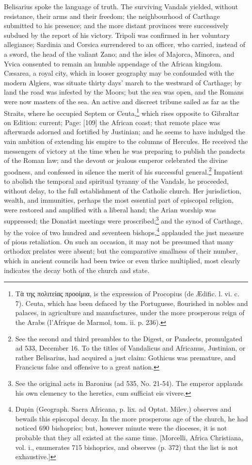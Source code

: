 Belisarius spoke the language of truth. The surviving Vandals yielded, without resistance, their arms and their freedom; the neighbourhood of Carthage submitted to his presence; and the more distant provinces were successively subdued by the report of his victory. Tripoli was confirmed in her voluntary allegiance; Sardinia and Corsica surrendered to an officer, who carried, instead of a sword, the head of the valiant Zano; and the isles of Majorca, Minorca, and Yvica consented to remain an humble appendage of the African kingdom. Cæsarea, a royal city, which in looser geography may be confounded with the modern Algiers, was situate thirty days\texthebrew{}’ march to the westward of Carthage; by land the road was infested by the Moors; but the sea was open, and the Romans were now masters of the sea. An active and discreet tribune sailed as far as the Straits, where he occupied Septem or Ceuta,\footnote{\textgreek{Τ\texthebrew{ὰ} της πολιτείας προοίμια}, is the expression of Procopius (de Ædific. l. vi. c. 7). Ceuta, which has been defaced by the Portuguese, flourished in nobles and palaces, in agriculture and manufactures, under the more prosperous reign of the Arabs (l\texthebrew{}’Afrique de Marmol, tom. ii. p. 236).} which rises opposite to Gibraltar on Edition: current; Page: [109] the African coast; that remote place was afterwards adorned and fortified by Justinian; and he seems to have indulged the vain ambition of extending his empire to the columns of Hercules. He received the messengers of victory at the time when he was preparing to publish the pandects of the Roman law; and the devout or jealous emperor celebrated the divine goodness, and confessed in silence the merit of his successful general.\footnote{See the second and third preambles to the Digest, or Pandects, promulgated ad 533, December 16. To the titles of Vandalicus and Africanus, Justinian, or rather Belisarius, had acquired a just claim: Gothicus was premature, and Francicus false and offensive to a great nation.} Impatient to abolish the temporal and spiritual tyranny of the Vandals, he proceeded, without delay, to the full establishment of the Catholic church. Her jurisdiction, wealth, and immunities, perhaps the most essential part of episcopal religion, were restored and amplified with a liberal hand; the Arian worship was suppressed; the Donatist meetings were proscribed;\footnote{See the original acts in Baronius (ad 535, No. 21-54). The emperor applauds his own clemency to the heretics, cum sufficiat eis vivere.} and the synod of Carthage, by the voice of two hundred and seventeen bishops,\footnote{Dupin (Geograph. Sacra Africana, p. lix. ad Optat. Milev.) observes and bewails this episcopal decay. In the more prosperous age of the church, he had noticed 690 bishoprics; but, however minute were the dioceses, it is not probable that they all existed at the same time. [Morcelli, Africa Christiana, vol. i., enumerates 715 bishoprics, and observes (p. 372) that the list is not exhaustive.]} applauded the just measure of pious retaliation. On such an occasion, it may not be presumed that many orthodox prelates were absent; but the comparative smallness of their number, which in ancient councils had been twice or even thrice multiplied, most clearly indicates the decay both of the church and state. 